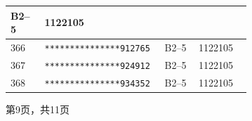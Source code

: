 \documentclass[UTF8,10pt,a4paper,fontset=fandol]{ctexart}
\newcommand{\fieldvalue}[1]{#1}
\begin{document}
\begin{center}
\begin{tabular}{|p{0.13\linewidth}|p{0.22\linewidth}|p{0.13\linewidth}|p{0.20\linewidth}|}
\fieldvalue{B2--5}
&
\fieldvalue{1122105}
&\\
\hline
\fieldvalue{366}
&
\fieldvalue{\texttt{***************912765}}
&
\fieldvalue{B2--5}
&
\fieldvalue{1122105}
&\\
\hline
\fieldvalue{367}
&
\fieldvalue{\texttt{***************924912}}
&
\fieldvalue{B2--5}
&
\fieldvalue{1122105}
&\\
\hline
\fieldvalue{368}
&
\fieldvalue{\texttt{***************934352}}
&
\fieldvalue{B2--5}
&
\fieldvalue{1122105}
&\\
\hline
\end{tabular}
\end{center}

\begin{center}
第9页，共11页
\end{center}

\newpage
\end{document}
